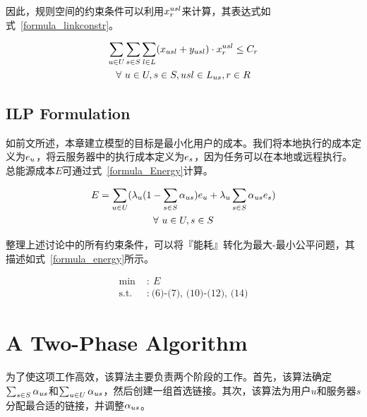 因此，规则空间的约束条件可以利用$x^{usl}_{r}$来计算，其表达式如式~\eqref{formula_linkconstr}。

\begin{equation}
\label{formula_linkconstr}
\begin{gathered}
\sum\limits_{u \in U}\sum\limits_{s \in S}\sum\limits_{l \in L}(x_{usl} + y_{usl}) \cdot x^{usl}_{r} \leq C_r\\
\forall\ u \in U, s \in S, usl\in L_{us}, r\in R\\
\end{gathered}
\end{equation}

\subsection{ILP Formulation}
如前文所述，本章建立模型的目标是最小化用户的成本。我们将本地执行的成本定义为$e_u$，将云服务器中的执行成本定义为$e_s$，因为任务可以在本地或远程执行。总能源成本$E$可通过式~\eqref{formula_Energy}计算。

\begin{equation}
\label{formula_Energy}
\begin{gathered}
E = \sum\limits_{u\in U}({\lambda}_{u}(1-\sum\limits_{s\in S}{\alpha}_{us})e_u + {\lambda}_{u}\sum\limits_{s\in S}{\alpha}_{us}e_s)\\
\forall\ u \in U, s \in S\\
\end{gathered}
\end{equation}

整理上述讨论中的所有约束条件，可以将『能耗』转化为最大-最小公平问题，其描述如式~\eqref{formula_energy}所示。

\begin{equation}
\label{formula_energy}
\begin{aligned}
\text{min }&{:}\ E\\
\text{s.t. }&{:}\ \text{(6)-(7), (10)-(12), (14)}
\end{aligned}
\end{equation}

\section{A Two-Phase Algorithm}

为了使这项工作高效，该算法主要负责两个阶段的工作。首先，该算法确定$\sum_{s \in S}{\alpha}_{us}$和$\sum_{u \in U}{\alpha}_{us}$，然后创建一组首选链接。其次，该算法为用户$u$和服务器$s$分配最合适的链接，并调整${\alpha}_{us}$。

